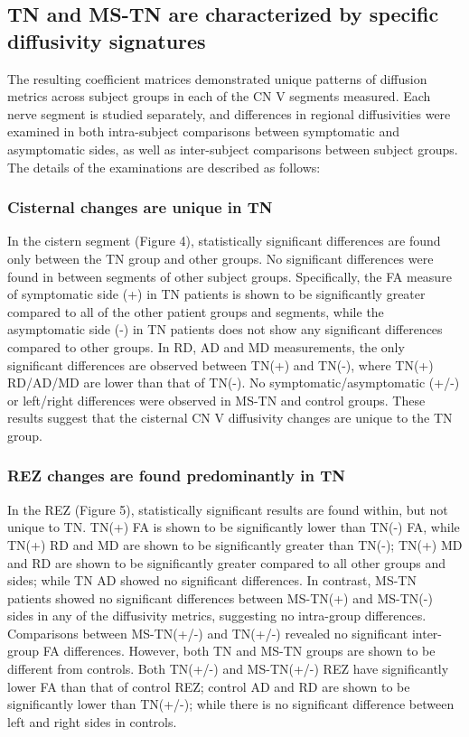 \subsection{TN and MS-TN are characterized by specific diffusivity signatures}
The resulting coefficient matrices demonstrated unique patterns of diffusion metrics across subject groups in each of the CN V segments measured. Each nerve segment is studied separately, and differences in regional diffusivities were examined in both intra-subject comparisons between symptomatic and asymptomatic sides, as well as inter-subject comparisons between subject groups. The details of the examinations are described as follows:

\subsubsection{Cisternal changes are unique in TN}
In the cistern segment (Figure 4), statistically significant differences are found only between the TN group and other groups. No significant differences were found in between segments of other subject groups. Specifically, the FA measure of symptomatic side (+) in TN patients is shown to be significantly greater compared to all of the other patient groups and segments, while the asymptomatic side (-) in TN patients does not show any significant differences compared to other groups. In RD, AD and MD measurements, the only significant differences are observed between TN(+) and TN(-), where TN(+) RD/AD/MD are lower than that of TN(-). No symptomatic/asymptomatic (+/-) or left/right differences were observed in MS-TN and control groups. These results suggest that the cisternal CN V diffusivity changes are unique to the TN group. 

\subsubsection{REZ changes are found predominantly in TN}
In the REZ (Figure 5), statistically significant results are found within, but not unique to TN. TN(+) FA is shown to be significantly lower than TN(-) FA, while TN(+) RD and MD are shown to be significantly greater than TN(-); TN(+) MD and RD are shown to be significantly greater compared to all other groups and sides; while TN AD showed no significant differences. In contrast, MS-TN patients showed no significant differences between MS-TN(+) and MS-TN(-) sides in any of the diffusivity metrics, suggesting no intra-group differences. Comparisons between MS-TN(+/-) and TN(+/-) revealed no significant inter-group FA differences. However, both TN and MS-TN groups are shown to be different from controls. Both TN(+/-) and MS-TN(+/-) REZ have significantly lower FA than that of control REZ; control AD and RD are shown to be significantly lower than TN(+/-); while there is no significant difference between left and right sides in controls. 
